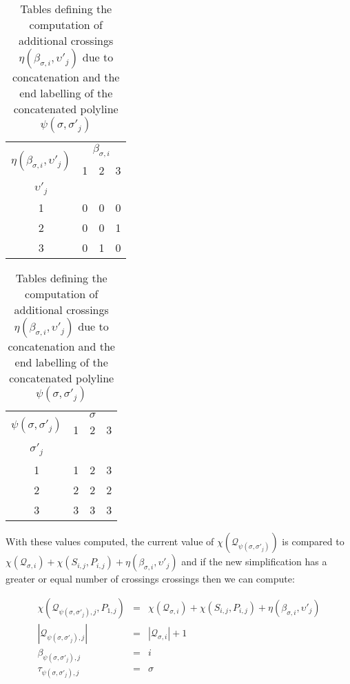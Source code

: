 \documentclass{article}
\begin{document}
 \begin{table}[ht]
	\begin{minipage}[b]{0.45\linewidth}\centering
	\begin{tabular}{|c|ccc|}
	\hline  \multirow{2}{*}{$\eta(\beta_{\sigma,i},\upsilon'_j)$} & \multicolumn{3}{|c|}{$\beta_{\sigma,i}$} \\
	   & 1 & 2 & 3  \\  
	\hline
	$\upsilon'_j$ & & &  \\
	1 & 0 & 0 & 0  \\
	2  & 0 & 0 & 1  \\
	3  & 0 & 1 & 0  \\
	\hline
	\end{tabular}
	\end{minipage}
	\begin{minipage}[b]{0.45\linewidth}
	\centering
	\begin{tabular}{|c|ccc|}
	\hline  \multirow{2}{*}{$\psi(\sigma,\sigma'_j)$} & \multicolumn{3}{|c|}{$\sigma$} \\
	   & 1 & 2 & 3  \\  
	\hline
	$\sigma'_j$ & & & \ \\
	1  & 1 & 2 & 3  \\
	2  & 2 & 2 & 2  \\
	3  & 3 & 3 & 3  \\
	\hline
	\end{tabular}
	\end{minipage}
	\caption{Tables defining the computation of additional crossings $\eta(\beta_{\sigma,i},\upsilon'_j)$ due to concatenation and the end labelling of the concatenated polyline $\psi(\sigma,\sigma'_j)$}
	\label{tab:etapsi}
	\end{table}
 
With these values computed, the current value of
$\chi(\mathcal{Q}_{\psi(\sigma,\sigma'_j)})$ is compared to
$\chi(\mathcal{Q}_{\sigma,i}) + \chi(S_{i,j},P_{i,j}) +
\eta(\beta_{\sigma,i},\upsilon'_j)$ and if the new simplification has a
greater or equal number of crossings crossings then we can compute:
 
\begin{eqnarray*}
\chi(\mathcal{Q}_{\psi(\sigma,\sigma'_j),j},P_{1,j}) &=&  \chi(\mathcal{Q}_{\sigma,i}) + \chi(S_{i,j},P_{i,j}) + \eta(\beta_{\sigma,i},\upsilon'_j)\\
|\mathcal{Q}_{\psi(\sigma,\sigma'_j),j}| &=& |\mathcal{Q}_{\sigma,i}| + 1 \\
\beta_{\psi(\sigma,\sigma'_j),j} &=& i\\
\tau_{\psi(\sigma,\sigma'_j),j} &=& \sigma
\end{eqnarray*}
\end{document}
